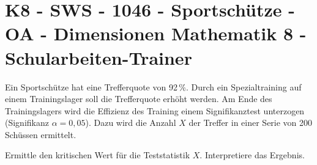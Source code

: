 \section{K8 - SWS - 1046 - Sportschütze - OA - Dimensionen Mathematik 8 - Schularbeiten-Trainer}

\begin{beispiel}[K8 - SWS]{1}
Ein Sportschütze hat eine Trefferquote von 92\,\%. Durch ein Spezialtraining auf einem Trainingslager soll die Trefferquote erhöht werden. Am Ende des Trainingslagers wird die Effizienz des Training einem Signifikanztest unterzogen (Signifikanz $\alpha=0,05$). Dazu wird die Anzahl $X$ der Treffer in einer Serie von 200 Schüssen ermittelt.

Ermittle den kritischen Wert für die Teststatistik $X$. Interpretiere das Ergebnis.

\end{beispiel}